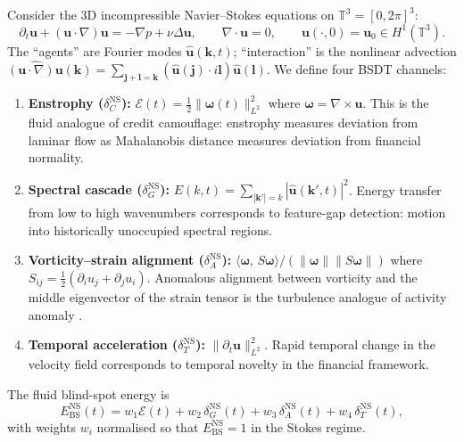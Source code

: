 \documentclass[final]{siamltex}
\newcommand{\T}{\mathbb{T}}
\newcommand{\norm}[1]{\lVert #1 \rVert}
\newcommand{\inner}[2]{\langle #1,\, #2 \rangle}
\providecommand{\grad}{\nabla}
\newcommand{\Ebs}{E_{\mathrm{BS}}}
\begin{document}
Consider the 3D incompressible Navier--Stokes equations on
$\T^3=[0,2\pi]^3$:
\begin{equation}\label{eq:ns}
  \partial_t\bm{u}+(\bm{u}\cdot\grad)\bm{u}
  = -\grad p + \nu\Delta\bm{u},\qquad
  \grad\cdot\bm{u}=0,\qquad
  \bm{u}(\cdot,0)=\bm{u}_0\in H^1(\T^3).
\end{equation}
The ``agents'' are Fourier modes $\hat{\bm{u}}(\bm{k},t)$;
``interaction'' is the nonlinear advection
$\widehat{(\bm{u}\cdot\grad)\bm{u}}(\bm{k})=\sum_{\bm{j}+\bm{l}=\bm{k}}
(\hat{\bm{u}}(\bm{j})\cdot i\bm{l})\hat{\bm{u}}(\bm{l})$.
We define four BSDT channels:
\begin{enumerate}
\item \textbf{Enstrophy ($\delta_C^{\mathrm{NS}}$):}
  $\mathcal{E}(t)=\frac{1}{2}\norm{\bm{\omega}(t)}_{L^2}^2$
  where $\bm{\omega}=\grad\times\bm{u}$. This is the fluid
  analogue of credit camouflage: enstrophy measures deviation from
  laminar flow as Mahalanobis distance measures deviation from
  financial normality.

\item \textbf{Spectral cascade ($\delta_G^{\mathrm{NS}}$):}
  $E(k,t)=\sum_{|\bm{k}'|=k}|\hat{\bm{u}}(\bm{k}',t)|^2$. Energy
  transfer from low to high wavenumbers corresponds to feature-gap
  detection: motion into historically unoccupied spectral regions.

\item \textbf{Vorticity--strain alignment
  ($\delta_A^{\mathrm{NS}}$):}
  $\inner{\bm{\omega}}{S\bm{\omega}}/
  (\norm{\bm{\omega}}\norm{S\bm{\omega}})$
  where $S_{ij}=\frac{1}{2}(\partial_i u_j+\partial_j u_i)$.
  Anomalous alignment between vorticity and the middle eigenvector
  of the strain tensor is the turbulence analogue of activity
  anomaly \cite{ashurst1987,tsinober1992}.

\item \textbf{Temporal acceleration ($\delta_T^{\mathrm{NS}}$):}
  $\norm{\partial_t\bm{u}}_{L^2}^2$. Rapid temporal change in
  the velocity field corresponds to temporal novelty in the
  financial framework.
\end{enumerate}

The fluid blind-spot energy is
\begin{equation}\label{eq:ebs_ns}
  \Ebs^{\mathrm{NS}}(t) = w_1\mathcal{E}(t)
  + w_2\,\delta_G^{\mathrm{NS}}(t)
  + w_3\,\delta_A^{\mathrm{NS}}(t)
  + w_4\,\delta_T^{\mathrm{NS}}(t),
\end{equation}
with weights $w_i$ normalised so that
$\Ebs^{\mathrm{NS}}=1$ in the Stokes regime.
\end{document}
